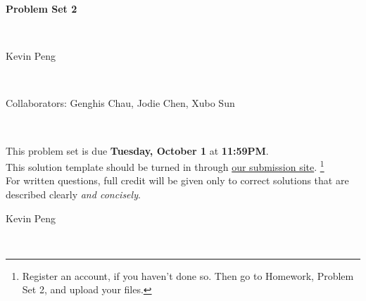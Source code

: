 \documentclass[12pt,twoside]{article}
\newcommand{\theproblemsetnum}{2}
\newcommand{\yourname}{Kevin Peng}
\newcommand{\yourcollaborators}{Genghis Chau, Jodie Chen, Xubo Sun}
\begin{document}
\begin{center}
\begin{Large} {\bf Problem Set \theproblemsetnum} \end{Large} \vspace{12 pt} \\
\begin{large} \yourname \end{large} \\
\begin{large} Collaborators:  \yourcollaborators \end{large} \\
\end{center}

\hrulefill
\medskip

This problem set is due {\bf Tuesday, October 1} at {\bf 11:59PM}. \\

This solution template should be turned in through \color{blue} \href{https://alg.csail.mit.edu}{our submission site}. \color{black}   \footnote{Register an account, if you haven't done so.  Then go to Homework, Problem Set 2, and upload your files.  } \\

For written questions, full credit will be given only to
correct solutions that are described clearly {\em and concisely}. \\

\medskip

\hrulefill

\newpage
\begin{large} \yourname \end{large} \\
\end{document}

